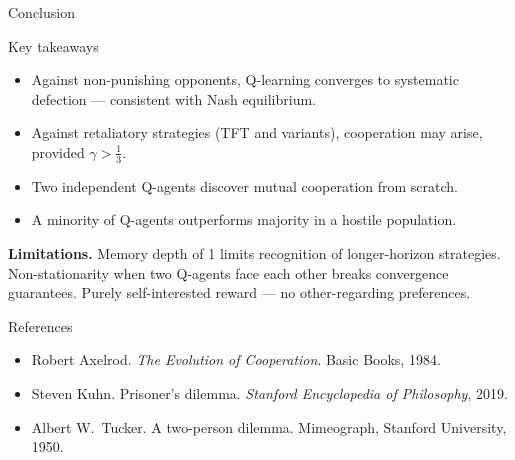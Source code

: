 \documentclass[10pt, aspectratio=169]{beamer}
\begin{document}
\begin{frame}{Conclusion}
  \begin{block}{Key takeaways}
    \begin{itemize}
      \item Against non-punishing opponents, Q-learning converges to systematic defection — consistent with Nash equilibrium.
      \item Against retaliatory strategies (TFT and variants), cooperation may arise, provided \(\gamma > \tfrac{1}{3}\).
      \item Two independent Q-agents discover mutual cooperation from scratch.
      \item A minority of Q-agents outperforms majority in a hostile population.
    \end{itemize}
  \end{block}
  \vspace{0.6em}
  \textbf{Limitations.}
  Memory depth of 1 limits recognition of longer-horizon strategies.
  Non-stationarity when two Q-agents face each other breaks convergence guarantees.
  Purely self-interested reward — no other-regarding preferences.
\end{frame}

\begin{frame}[allowframebreaks]{References}
  \small
  \begin{itemize}
    \item Robert Axelrod. \textit{The Evolution of Cooperation}. Basic Books, 1984.
    \item Steven Kuhn. Prisoner's dilemma. \textit{Stanford Encyclopedia of Philosophy}, 2019.
    \item Albert W.\ Tucker. A two-person dilemma. Mimeograph, Stanford University, 1950.
  \end{itemize}
\end{frame}
\end{document}
